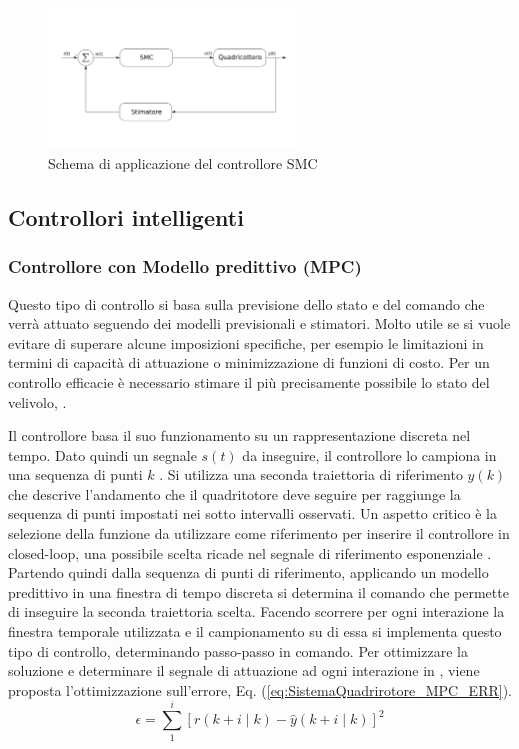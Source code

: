 \begin{figure}
	\centering
	\includegraphics[width=0.6\textwidth]{SistemaQuadrirotore/Figure/SMC}
	\caption{Schema di applicazione del controllore SMC}
\end{figure}

\subsection{Controllori intelligenti}

\subsubsection{Controllore con Modello predittivo (MPC)}

Questo tipo di controllo si basa sulla previsione dello stato e del comando che verrà attuato seguendo dei modelli previsionali e stimatori. Molto utile se si vuole evitare di superare alcune imposizioni specifiche, per esempio le limitazioni in termini di capacità di attuazione o minimizzazione di funzioni di costo.
Per un controllo efficacie è necessario stimare il più precisamente possibile lo stato del velivolo, \cite{KimJinho2020ACSo}.


Il controllore basa il suo funzionamento su un rappresentazione discreta nel tempo. Dato quindi un segnale $s(t)$ da inseguire, il controllore lo campiona in una sequenza di punti $k$ . Si utilizza una seconda traiettoria di riferimento $y(k)$ che descrive l'andamento che il quadritotore deve seguire per raggiunge la sequenza di punti impostati nei sotto intervalli osservati. Un aspetto critico è la selezione della funzione da utilizzare come riferimento per inserire il controllore in closed-loop, una possibile scelta ricade nel segnale di riferimento esponenziale \cite{AbdolhosseiniM2013AEMP}. Partendo quindi dalla sequenza di punti di riferimento, applicando un modello predittivo in una finestra di tempo discreta si determina il comando che permette di inseguire la seconda traiettoria scelta. Facendo scorrere per ogni interazione la finestra temporale utilizzata e il campionamento su di essa si implementa questo tipo di controllo, determinando passo-passo in comando.
Per ottimizzare la soluzione e determinare il segnale di attuazione ad ogni interazione in \cite{AbdolhosseiniM2013AEMP}, viene proposta l'ottimizzazione sull'errore, Eq. (\ref{eq:SistemaQuadrirotore_MPC_ERR}).
\begin{equation}\label{eq:SistemaQuadrirotore_MPC_ERR}
	\epsilon = \sum_{1}^{i} \left[r(k+i \mid k) - \hat{y}(k+i \mid k)\right]^2
\end{equation}

